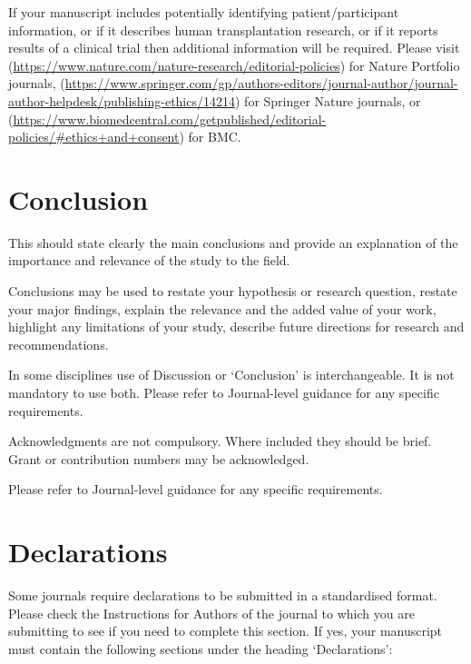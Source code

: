\documentclass[sn-apa,referee,pdflatex]{sn-jnl}
\begin{document}
If your manuscript includes potentially identifying patient/participant
information, or if it describes human transplantation research, or if it
reports results of a clinical trial then additional information will be
required. Please visit
(\url{https://www.nature.com/nature-research/editorial-policies}) for
Nature Portfolio journals,
(\url{https://www.springer.com/gp/authors-editors/journal-author/journal-author-helpdesk/publishing-ethics/14214})
for Springer Nature journals, or
(\url{https://www.biomedcentral.com/getpublished/editorial-policies/\#ethics+and+consent})
for BMC.

\hypertarget{sec13}{%
\section{Conclusion}\label{sec13}}

This should state clearly the main conclusions and provide an
explanation of the importance and relevance of the study to the field.

Conclusions may be used to restate your hypothesis or research question,
restate your major findings, explain the relevance and the added value
of your work, highlight any limitations of your study, describe future
directions for research and recommendations.

In some disciplines use of Discussion or `Conclusion' is
interchangeable. It is not mandatory to use both. Please refer to
Journal-level guidance for any specific requirements.

\backmatter


Acknowledgments are not compulsory. Where included they should be brief.
Grant or contribution numbers may be acknowledged.

Please refer to Journal-level guidance for any specific requirements.

\hypertarget{declarations}{%
\section*{Declarations}\label{declarations}}

Some journals require declarations to be submitted in a standardised
format. Please check the Instructions for Authors of the journal to
which you are submitting to see if you need to complete this section. If
yes, your manuscript must contain the following sections under the
heading `Declarations':
\end{document}
